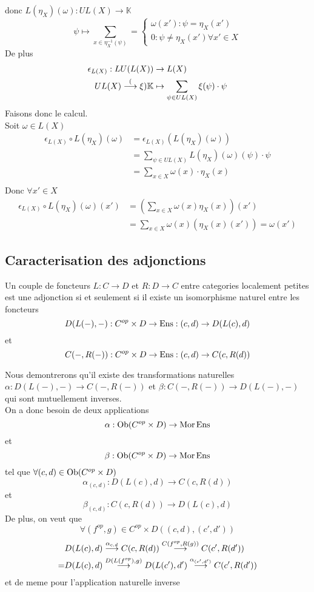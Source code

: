 \documentclass[../main.tex]{subfiles}
\begin{document}
donc $L( \eta_X)( \omega) : UL( X) \to \mathbb{K} $ 
\[ 
	\psi \mapsto \sum_{x \in \eta_X^{-1}( \psi) } = 
	\begin{cases}
		\omega( x') : \psi = \eta_X( x') \\
		0 : \psi \neq \eta_X( x') \forall x' \in X
	\end{cases}
\]
De plus
\begin{align*}
	\epsilon_{L( X) } : LU( L( X) ) &\to L( X) \\
	UL( X) \overset{(}{\longrightarrow} \xi) \mathbb{K} &\mapsto \sum_{\psi \in UL( X) } \xi( \psi) \cdot \psi
\end{align*}
Faisons donc le calcul.\\
Soit $\omega\in L( X) $ 
\begin{align*}
	\epsilon_{L( X) } \circ L( \eta_X) ( \omega) &= \epsilon_{L( X) } ( L( \eta_X) ( \omega) ) \\
						     &= \sum_{\psi\in UL( X) } L( \eta_X) ( \omega) ( \psi) \cdot \psi\\
						     &= \sum_{x \in  X} \omega( x) \cdot \eta_X( x) \\
\end{align*}
Donc $\forall x' \in X$ 
\begin{align*}
	\epsilon_{L( X) } \circ L( \eta_X) ( \omega) ( x') &= \left( \sum_{x \in X}^{ }\omega( x) \eta_X( x)  \right)( x') \\
							   &= \sum_{x\in X} \omega( x) ( \eta_X( x) ( x') ) = \omega( x') 
\end{align*}
\subsection{Caracterisation des adjonctions}
\begin{propo}
Un couple de foncteurs $L:C\to D$ et $R : D \to C$ entre categories localement petites est une adjonction si et seulement si il existe un isomorphisme naturel entre les foncteurs
\[ 
	D( L( -) ,-) : C^{op}\times D	\to \operatorname{Ens} : ( c,d) \to D( L( c) ,d) 		
\]
et
\[ 
	C( -,R( -) ) :C^{op}\times D\to \operatorname{Ens}: ( c,d) \to C( c,R( d) ) 	
\]

\end{propo}
Nous demontrerons qu'il existe des transformations naturelles $\alpha: D( L( -) ,-) \to C( -,R( -) ) $ et $\beta:C(-,R( -)   ) \to D( L( -) ,-) $ qui sont mutuellement inverses.\\
On a donc besoin de deux applications 
\[ 
	\alpha: \operatorname{Ob} ( C^{op}\times D) \to \operatorname{Mor} \operatorname{Ens}
\]
et 
\[ 
	\beta: \operatorname{Ob} ( C^{op}\times D) \to \operatorname{Mor} \operatorname{Ens}
\]
tel que $\forall ( c,d) \in \operatorname{Ob} ( C^{op}\times D) $ 
\[ 
	\alpha_{( c,d) } : D( L( c) ,d) \to C( c,R( d) ) 
\]
et 
\[ 
	\beta_{( c,d) } : C( c,R( d) ) \to D( L( c) ,d) 
\]
De plus, on veut que
\[ 
	\forall ( f^{op},g) \in C^{op}\times D ( ( c,d) ,( c',d') ) 
\]
\begin{align*}
	&D( L( c) ,d) \overset{ \alpha_{c,d} }{\longrightarrow} C( c,R( d) ) \overset{ C( f^{op},R( g) ) }{\longrightarrow} C( c',R( d') )  \\
	=& D( L( c) ,d) \overset{ D( L( f^{op}) ,g) }{\longrightarrow} D( L( c') ,d') \overset{ \alpha_{( c',d') } }{\longrightarrow} C( c',R( d') ) 
\end{align*}
et de meme pour l'application naturelle inverse
\end{document}
